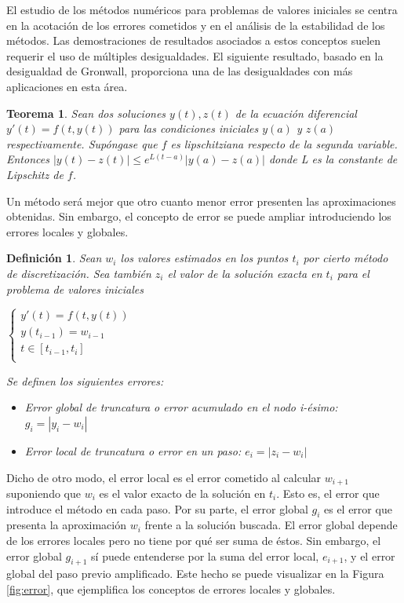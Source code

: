 \documentclass{article}
\theoremstyle{theorem-style}  %
\newtheorem{theorem}{Teorema}[section]  %
\theoremstyle{definition-style}
\newtheorem{definition}{Definición}[section]
\theoremstyle{example-style}
\begin{document}
	El estudio de los métodos numéricos para problemas de valores iniciales se centra en la acotación de los errores cometidos y en el análisis de la estabilidad de los métodos. Las demostraciones de resultados asociados a estos conceptos suelen requerir el uso de múltiples desigualdades. El siguiente resultado, basado en la desigualdad de Gronwall, proporciona una de las desigualdades con más aplicaciones en esta área.
	
	\begin{theorem} \label{theorem:desigualdad-sols}
		Sean dos soluciones $y(t), z(t)$ de la ecuación diferencial $y'(t) = f(t,y(t))$ para las condiciones iniciales $y(a)$ y $z(a)$ respectivamente. Supóngase que $f$ es lipschitziana respecto de la segunda variable. Entonces $|y(t)-z(t)| \leq e^{L(t-a)}|y(a)-z(a)|$ donde L es la constante de Lipschitz de $f$.
	\end{theorem}

	Un método será mejor que otro cuanto menor error presenten las aproximaciones obtenidas. Sin embargo, el concepto de error se puede ampliar introduciendo los errores locales y globales.
	
	\begin{definition} 
		Sean $w_i$ los valores estimados en los puntos $t_i$ por cierto método de discretización. Sea también $z_i$ el valor de la solución exacta en $t_i$ para el problema de valores iniciales
		
		\begin{center}
			$\begin{cases}
			y'(t) = f(t,y(t)) \\
			y(t_{i-1}) = w_{i-1} \\
			t \in [t_{i-1},t_{i}] \\
			\end{cases}$
		\end{center}

		Se definen los siguientes errores:
	
		\begin{itemize}
			\item Error global de truncatura o error acumulado en el nodo i-ésimo: $g_i=|y_i - w_i|$
			\item Error local de truncatura o error en un paso: $e_i = |z_i - w_i|$
		\end{itemize} 
	\end{definition}
	
	Dicho de otro modo, el error local es el error cometido al calcular $w_{i+1}$ suponiendo que $w_i$ es el valor exacto de la solución en $t_i$. Esto es, el error que introduce el método en cada paso. Por su parte, el error global $g_i$ es el error que presenta la aproximación $w_i$ frente a la solución buscada. El error global depende de los errores locales pero no tiene por qué ser suma de éstos. Sin embargo, el error global $g_{i+1}$ sí puede entenderse por la suma del error local, $e_{i+1}$, y el error global del paso previo amplificado. Este hecho se puede visualizar en la Figura \ref{fig:error}, que ejemplifica los conceptos de errores locales y globales.
		
\end{document}
